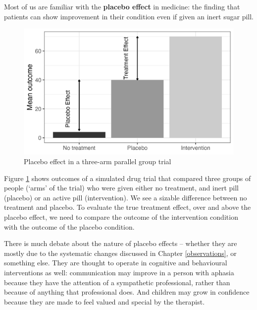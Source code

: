 \documentclass{krantz}
\begin{document}
Most of us are familiar with the \textbf{placebo effect} in medicine: the finding that patients can show improvement in their condition even if given an inert sugar pill.

\begin{figure}
\includegraphics[width=0.75\linewidth]{images_bw/placebotab} \caption{Placebo effect in a three-arm parallel group trial}\label{fig:placebotab}
\end{figure}

Figure \ref{fig:placebotab} shows outcomes of a simulated drug trial that compared three groups of people (`arms' of the trial) who were given either no treatment, and inert pill (placebo) or an active pill (intervention). We see a sizable difference between no treatment and placebo. To evaluate the true treatment effect, over and above the placebo effect, we need to compare the outcome of the intervention condition with the outcome of the placebo condition.

There is much debate about the nature of placebo effects -- whether they are mostly due to the systematic changes discussed in Chapter \ref{observations}, or something else. They are thought to operate in cognitive and behavioural interventions as well: communication may improve in a person with aphasia because they have the attention of a sympathetic professional, rather than because of anything that professional does. And children may grow in confidence because they are made to feel valued and special by the therapist.
\end{document}
